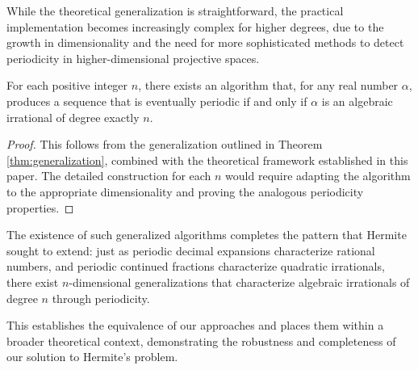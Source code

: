 \begin{remark}
While the theoretical generalization is straightforward, the practical implementation becomes increasingly complex for higher degrees, due to the growth in dimensionality and the need for more sophisticated methods to detect periodicity in higher-dimensional projective spaces.
\end{remark}

\begin{proposition}\label{prop:generalized_hermite}
For each positive integer $n$, there exists an algorithm that, for any real number $\alpha$, produces a sequence that is eventually periodic if and only if $\alpha$ is an algebraic irrational of degree exactly $n$.
\end{proposition}

\begin{proof}
This follows from the generalization outlined in Theorem \ref{thm:generalization}, combined with the theoretical framework established in this paper. The detailed construction for each $n$ would require adapting the \HAPD{} algorithm to the appropriate dimensionality and proving the analogous periodicity properties.
\end{proof}

\begin{remark}
The existence of such generalized algorithms completes the pattern that Hermite sought to extend: just as periodic decimal expansions characterize rational numbers, and periodic continued fractions characterize quadratic irrationals, there exist $n$-dimensional generalizations that characterize algebraic irrationals of degree $n$ through periodicity.
\end{remark}

This establishes the equivalence of our approaches and places them within a broader theoretical context, demonstrating the robustness and completeness of our solution to Hermite's problem.
